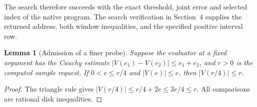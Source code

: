 \documentclass[11pt]{amsart}
\newtheorem{lemma}[theorem]{Lemma}
\theoremstyle{definition}
\theoremstyle{remark}
\numberwithin{equation}{section}
\begin{document}
The search therefore succeeds with the
exact threshold, joint error and
selected index of the native program. The search
verification in Section~4 supplies the returned
address, both window inequalities, and the
specified positive interval row.

\begin{lemma}[Admission of a finer probe]\label{lem:admit}
Suppose the evaluator at a fixed argument has the Cauchy estimate
$|V(e_1)-V(e_2)|\le e_1+e_2$, and $r>0$ is the computed
sample request. If $0<e\le r/4$ and $|V(e)|\le e$, then
$|V(r/4)|\le r$.
\end{lemma}
\begin{proof}
The triangle rule gives
$|V(r/4)|\le r/4+2e\le3r/4\le r$.
All comparisons are rational disk inequalities.
\end{proof}
\end{document}
